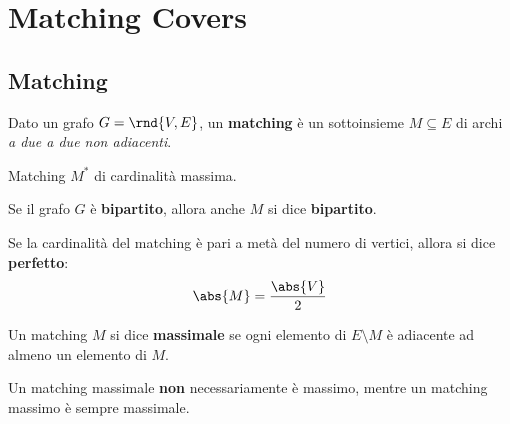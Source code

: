 \documentclass[\main/main.tex]{subfiles}
\begin{document}
\chapter{Matching Covers}

\section{Matching}
\setlength\columnsep{25pt}
\begin{multicols}{2}
	\begin{definition}
		Dato un grafo \(G=\rnd{V, E}\), un \textbf{matching} è un sottoinsieme \(M\subseteq E\) di archi \textit{a due a due non adiacenti}.
	\end{definition}
	\begin{definition}
		Matching \(M^*\) di cardinalità massima.
	\end{definition}
	\begin{definition}
		Se il grafo \(G\) è \textbf{bipartito}, allora anche \(M\) si dice \textbf{bipartito}.
	\end{definition}
	\begin{definition}
		Se la cardinalità del matching è pari a metà del numero di vertici, allora si dice \textbf{perfetto}:
		\[
			\abs{M} = \frac{\abs{V}}{2}
		\]
	\end{definition}
	\begin{definition}
		Un matching \(M\) si dice \textbf{massimale} se ogni elemento di \(E\setminus M\) è adiacente ad almeno un elemento di \(M\).

		Un matching massimale \textbf{non} necessariamente è massimo, mentre un matching massimo è sempre massimale.
	\end{definition}
\end{multicols}
\end{document}
